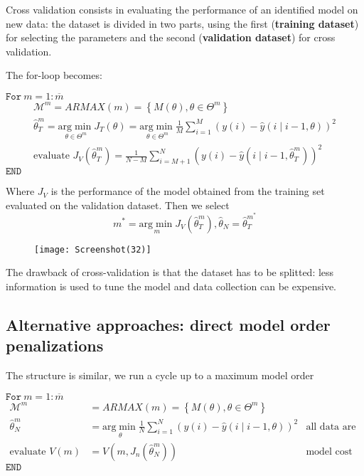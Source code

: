 Cross validation consists in evaluating the performance of an identified model on new data: the dataset is divided in two parts, using the first (\textbf{training dataset}) for selecting the parameters and the second (\textbf{validation dataset}) for cross validation.

The for-loop becomes:

$ \mathtt{For } \ m=1:\overline{m}$
\begin{gather*}
\mathcal{M}^{m} =ARMAX(m) =\left\{M(\theta) ,\theta \in \Theta ^{m}\right\}\\
\hat{\theta }_{T}^{m} =\underset{\theta \in \Theta ^{m}}{\mathrm{arg}\min} J_{T}(\theta) =\underset{\theta \in \Theta ^{m}}{\mathrm{arg}\min}\frac{1}{M}\sum _{i=1}^{M}(y(i) -\hat{y}(i\mid i-1,\theta))^{2}\\
\text{evaluate } J_{V}\left(\hat{\theta }_{T}^{m}\right) =\frac{1}{N-M}\sum _{i=M+1}^{N}\left(y(i) -\hat{y}\left(i\mid i-1,\hat{\theta }_{T}^{m}\right)\right)^{2}
\end{gather*}
$ \mathtt{END}$

Where $ J_{V}$ is the performance of the model obtained from the training set evaluated on the validation dataset. Then we select
\begin{equation*}
m^{*} =\underset{m}{\mathrm{arg}\min} J_{V}\left(\hat{\theta }_{T}^{m}\right) ,\hat{\theta }_{N} =\hat{\theta }_{T}^{m^{*}}
\end{equation*}

\begin{figure}[htpb]
    \centering
    \texttt{[image: Screenshot(32)]}
\end{figure}
\FloatBarrier
The drawback of cross-validation is that the dataset has to be splitted: less information is used to tune the model and data collection can be expensive.


\subsection{Alternative approaches: direct model order penalizations}
The structure is similar, we run a cycle up to a maximum model order

$ \mathtt{For } \ m=1:\overline{m}$
\begin{equation*}
\begin{aligned}
\mathcal{M}^{m} & =ARMAX(m) =\left\{M(\theta) ,\theta \in \Theta ^{m}\right\} & \\
\hat{\theta }_{N}^{m}  & =\underset{\theta }{\mathrm{arg}\min}\frac{1}{N}\sum _{i=1}^{N}(y(i) -\hat{y}(i\mid i-1,\theta))^{2} & \text{all data are used to tune the model}\\
\text{evaluate } V(m) & =V\left(m,J_{n}\left(\hat{\theta }_{N}^{m}\right)\right) & \text{model cost with model order penalization}
\end{aligned}
\end{equation*}
$ \mathtt{END}$

